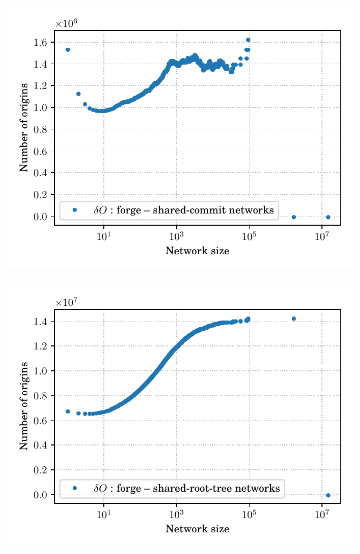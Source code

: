 \begin{figure}
    \centering
    \begin{subfigure}{.45\textwidth}
    \includegraphics[width=\linewidth]{img/forks/wccdf-forges-swhrev.pdf}
    \end{subfigure}
    \begin{subfigure}{.45\textwidth}
    \includegraphics[width=\linewidth]{img/forks/wccdf-forges-swhrootdir.pdf}
    \end{subfigure}
    \newline
    \begin{subfigure}{.45\textwidth}

\end{subfigure}
\end{figure}
